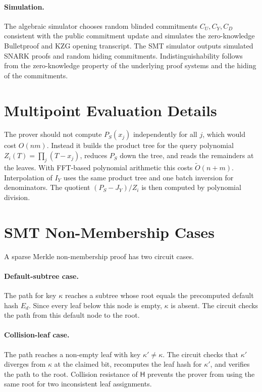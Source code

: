 \documentclass[runningheads]{llncs}
\newcommand{\CRH}{\mathsf{H}}
\newcommand{\softO}{\widetilde{O}}
\begin{document}
\paragraph{Simulation.}
The algebraic simulator chooses random blinded commitments \(C_U,C_Y,C_D\) consistent with the public commitment update and simulates the zero-knowledge Bulletproof and KZG opening transcript.  The SMT simulator outputs simulated SNARK proofs and random hiding commitments.  Indistinguishability follows from the zero-knowledge property of the underlying proof systems and the hiding of the commitments.

\section{Multipoint Evaluation Details}\label{app:mpe}

The prover should not compute \(P_S(x_j)\) independently for all \(j\), which would cost \(O(nm)\).  Instead it builds the product tree for the query polynomial \(Z_i(T)=\prod_j(T-x_j)\), reduces \(P_S\) down the tree, and reads the remainders at the leaves.  With FFT-based polynomial arithmetic this costs \(\softO(n+m)\).  Interpolation of \(I_Y\) uses the same product tree and one batch inversion for denominators.  The quotient \((P_S-J_Y)/Z_i\) is then computed by polynomial division.

\section{SMT Non-Membership Cases}\label{app:smt-nonmem}

A sparse Merkle non-membership proof has two circuit cases.

\paragraph{Default-subtree case.}
The path for key \(\kappa\) reaches a subtree whose root equals the precomputed default hash \(E_d\).  Since every leaf below this node is empty, \(\kappa\) is absent.  The circuit checks the path from this default node to the root.

\paragraph{Collision-leaf case.}
The path reaches a non-empty leaf with key \(\kappa'\ne\kappa\).  The circuit checks that \(\kappa'\) diverges from \(\kappa\) at the claimed bit, recomputes the leaf hash for \(\kappa'\), and verifies the path to the root.  Collision resistance of \(\CRH\) prevents the prover from using the same root for two inconsistent leaf assignments.
\end{document}
